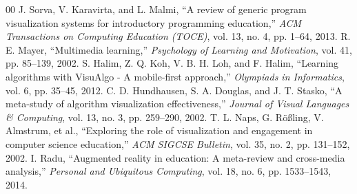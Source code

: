 \documentclass[conference]{IEEEtran}
\begin{document}
\begin{thebibliography}{00}
 J. Sorva, V. Karavirta, and L. Malmi, ``A review of generic program visualization systems for introductory programming education,'' \emph{ACM Transactions on Computing Education (TOCE)}, vol. 13, no. 4, pp. 1--64, 2013.
 R. E. Mayer, ``Multimedia learning,'' \emph{Psychology of Learning and Motivation}, vol. 41, pp. 85--139, 2002.
 S. Halim, Z. Q. Koh, V. B. H. Loh, and F. Halim, ``Learning algorithms with VisuAlgo - A mobile-first approach,'' \emph{Olympiads in Informatics}, vol. 6, pp. 35--45, 2012.
 C. D. Hundhausen, S. A. Douglas, and J. T. Stasko, ``A meta-study of algorithm visualization effectiveness,'' \emph{Journal of Visual Languages \& Computing}, vol. 13, no. 3, pp. 259--290, 2002.
 T. L. Naps, G. R\"o\ss ling, V. Almstrum, et al., ``Exploring the role of visualization and engagement in computer science education,'' \emph{ACM SIGCSE Bulletin}, vol. 35, no. 2, pp. 131--152, 2002.
 I. Radu, ``Augmented reality in education: A meta-review and cross-media analysis,'' \emph{Personal and Ubiquitous Computing}, vol. 18, no. 6, pp. 1533--1543, 2014.
\end{thebibliography}
\end{document}
